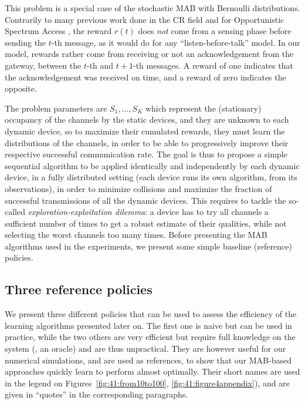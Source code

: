 This problem is a special case of the stochastic MAB with
Bernoulli distributions.
Contrarily to many previous work done in the CR field and for Opportunistic Spectrum Access \cite{Jouini10,Jouini12},
the reward $r(t)$ does \emph{not} come from a sensing phase before sending the $t$-th message, as it would do for any ``listen-before-talk'' model.
In our model, rewards rather come from receiving or not an acknowledgement from the gateway, between the $t$-th and $t+1$-th messages. A reward of one indicates that the acknowledgement was received on time, and a reward of zero indicates the opposite.

The problem parameters
are $S_1, \dots, S_K$ which represent the (stationary) occupancy of the channels by the static devices,
and they are unknown to each dynamic device, so to maximize their cumulated rewards, they must learn the distributions of the channels, in order to be able to progressively improve their respective successful communication rate.
%
The goal is thus to propose a simple sequential algorithm to be applied identically and independently by each dynamic device, in a fully distributed setting (each device runs its own algorithm, from its observations), in order to minimize collisions and maximize the fraction of successful transmissions of all the dynamic devices.
%
This requires to tackle the so-called \emph{exploration-exploitation dilemma}: a device has to try all channels a sufficient number of times to get a robust estimate of their qualities, while not selecting the worst channels too many times.
%
Before presenting the MAB algorithms used in the experiments, we present some simple baseline (reference) policies.


\subsection{Three reference policies}\label{sub:41:threeReferencePolicies}

We present three different policies that can be used to assess the efficiency of the learning algorithms presented later on.
The first one is naive but can be used in practice, while the two others are very efficient but require full knowledge on the system (\ie, an oracle) and are thus unpractical.
%
They are however useful for our numerical simulations, and are used as references, to show that our MAB-based approaches quickly learn to perform almost optimally.
%
Their short names are used in the legend on Figures~\ref{fig:41:from10to100}, \ref{fig:41:figure4appendix}), and are given in ``quotes'' in the corresponding paragraphs.


